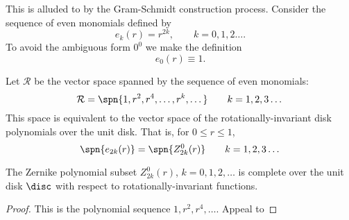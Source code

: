 This is alluded to by the Gram-Schmidt construction process.
Consider the sequence of even monomials defined by
\begin{equation}
  e_{k} (r) = r^{2k}, \qquad k=0,1,2\dots.
\end{equation}
To avoid the ambiguous form $0^{0}$ we make the definition
\begin{equation}
  e_{0}(r) \equiv 1.
\end{equation} 
\begin{myLemma}
Let $\mathcal{R}$ be the vector space spanned by the sequence of even monomials:
\begin{equation}
  \mathcal{R} = \spn{1, r^{2}, r^{4}, \dots, r^{k},\dots} \qquad k=1,2,3\dots
\end{equation}
This space is equivalent to the vector space of the rotationally-invariant disk polynomials over the unit disk. That is, for $0\le r\le 1$,
\begin{equation}
  \spn{e_{2k}(r)} = \spn{Z_{2k}^{0}(r)} \qquad k=1,2,3\dots
\end{equation}
\label{thm:Zernike spans}
\end{myLemma}

\begin{myTheorem}
The Zernike polynomial subset $Z_{2k}^{0}(r)$, $k=0,1,2,\dots$ is complete over the unit disk $\disc$ with respect to rotationally-invariant functions.
\label{thm:Zernike spans}
\end{myTheorem}

\begin{proof}
This is the polynomial sequence $1,r^{2},r^{4},\dots$.
Appeal to \ms
\end{proof}
%


\endinput %